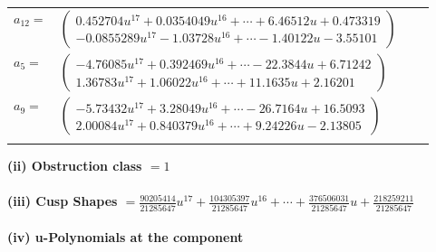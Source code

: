 \documentclass[1p]{elsarticle_modified}
\theoremstyle{definition}
\begin{document}
\begin{tabular}{m{7pt} m{180pt} m{7pt} m{180pt} }
\flushright $a_{12}=$&$\begin{pmatrix}0.452704 u^{17}+0.0354049 u^{16}+\cdots+6.46512 u+0.473319\\-0.0855289 u^{17}-1.03728 u^{16}+\cdots-1.40122 u-3.55101\end{pmatrix}$ \\
\flushright $a_{5}=$&$\begin{pmatrix}-4.76085 u^{17}+0.392469 u^{16}+\cdots-22.3844 u+6.71242\\1.36783 u^{17}+1.06022 u^{16}+\cdots+11.1635 u+2.16201\end{pmatrix}$ \\
\flushright $a_{9}=$&$\begin{pmatrix}-5.73432 u^{17}+3.28049 u^{16}+\cdots-26.7164 u+16.5093\\2.00084 u^{17}+0.840379 u^{16}+\cdots+9.24226 u-2.13805\end{pmatrix}$\\&\end{tabular}
\flushleft \textbf{(ii) Obstruction class $= 1$}\\~\\
\flushleft \textbf{(iii) Cusp Shapes $= \frac{90205414}{21285647} u^{17}+\frac{104305397}{21285647} u^{16}+\cdots+\frac{376506031}{21285647} u+\frac{218259211}{21285647}$}\\~\\
\newpage\renewcommand{\arraystretch}{1}
\flushleft \textbf{(iv) u-Polynomials at the component}\newline \\
\end{document}
